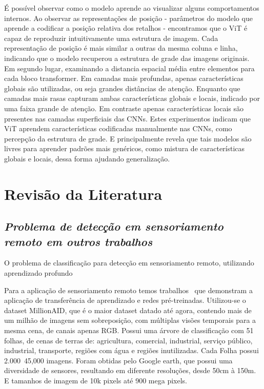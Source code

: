 É possível observar como o modelo aprende ao visualizar alguns comportamentos internos. Ao observar as representações de posição - parâmetros do modelo que aprende a codificar a posição relativa dos retalhos -  encontramos que o ViT é capaz de reproduzir intuitivamente uma estrutura de imagem. Cada representação de posição é mais similar a outras da mesma coluna e linha, indicando que o modelo recuperou a estrutura de grade das imagens originais. Em segundo lugar, examinando a distancia espacial média entre elementos para cada bloco transformer. Em camadas mais profundas, apenas características globais são utilizadas, ou seja grandes distâncias de atenção. Enquanto que camadas mais rasas capturam ambas características globais e locais, indicado por uma faixa grande de atenção. Em contraste apenas características locais são presentes nas camadas superficiais das CNNs. Estes experimentos indicam que ViT aprendem características codificadas manualmente nas CNNs, como percepção da estrutura de grade. E principalmente revela que tais modelos são livres para aprender padrões mais genéricos, como mistura de características globais e locais, dessa forma ajudando generalização.

\section{Revisão da Literatura}\label{sec:Cap2_revisao_literatura}

\subsection{\textit{Problema de detecção em sensoriamento remoto em outros trabalhos}}\label{sec:Cap2_outros_trabalhos}


O problema de classificação para detecção em sensoriamento remoto, utilizando aprendizado profundo~\cite{s20236936}


Para a aplicação de sensoriamento remoto temos trabalhos~\cite{wang2022empirical} que demonstram a aplicação de transferência de aprendizado e redes pré-treinadas. Utilizou-se o dataset MillionAID, que é o maior dataset datado até agora, contendo mais de um milhão de imagens sem sobreposição, com múltiplas visões temporais para a mesma cena, de canais apenas RGB. Possui uma árvore de classificação com 51 folhas, de cenas de terras de: agricultura, comercial, industrial, serviço público, industrial, transporte, regiões com água e regiões inutilizadas. Cada Folha possui 2.000~45,000 imagens. Foram obtidas pelo Google earth, que possui uma diversidade de sensores, resultando em diferente resoluções, desde 50cm à 150m. E tamanhos de imagem de 10k pixels até 900 mega pixels.






